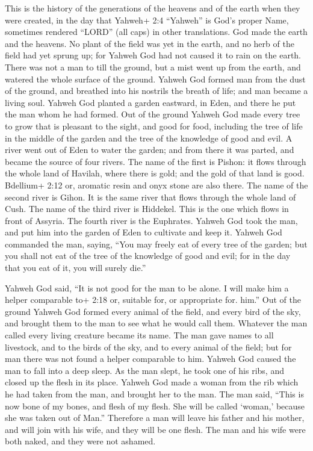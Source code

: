  This is the history of the generations of the heavens and
of the earth when they were created, in the day that Yahweh+ 2:4
``Yahweh'' is God's proper Name, sometimes rendered ``LORD'' (all caps)
in other translations. God made the earth and the heavens. 
No plant of the field was yet in the earth, and no herb of the field had
yet sprung up; for Yahweh God had not caused it to rain on the earth.
There was not a man to till the ground,  but a mist went up
from the earth, and watered the whole surface of the ground.
 Yahweh God formed man from the dust of the ground, and
breathed into his nostrils the breath of life; and man became a living
soul.  Yahweh God planted a garden eastward, in Eden, and
there he put the man whom he had formed.  Out of the ground
Yahweh God made every tree to grow that is pleasant to the sight, and
good for food, including the tree of life in the middle of the garden
and the tree of the knowledge of good and evil.  A river
went out of Eden to water the garden; and from there it was parted, and
became the source of four rivers.  The name of the first is
Pishon: it flows through the whole land of Havilah, where there is gold;
 and the gold of that land is good. Bdellium+ 2:12 or,
aromatic resin and onyx stone are also there.  The name of
the second river is Gihon. It is the same river that flows through the
whole land of Cush.  The name of the third river is
Hiddekel. This is the one which flows in front of Assyria. The fourth
river is the Euphrates.  Yahweh God took the man, and put
him into the garden of Eden to cultivate and keep it. 
Yahweh God commanded the man, saying, ``You may freely eat of every tree
of the garden;  but you shall not eat of the tree of the
knowledge of good and evil; for in the day that you eat of it, you will
surely die.''

 Yahweh God said, ``It is not good for the man to be alone.
I will make him a helper comparable to+ 2:18 or, suitable for, or
appropriate for. him.''  Out of the ground Yahweh God
formed every animal of the field, and every bird of the sky, and brought
them to the man to see what he would call them. Whatever the man called
every living creature became its name.  The man gave names
to all livestock, and to the birds of the sky, and to every animal of
the field; but for man there was not found a helper comparable to him.
 Yahweh God caused the man to fall into a deep sleep. As
the man slept, he took one of his ribs, and closed up the flesh in its
place.  Yahweh God made a woman from the rib which he had
taken from the man, and brought her to the man.  The man
said, ``This is now bone of my bones, and flesh of my flesh. She will be
called `woman,' because she was taken out of Man.'' 
Therefore a man will leave his father and his mother, and will join with
his wife, and they will be one flesh.  The man and his wife
were both naked, and they were not ashamed.

